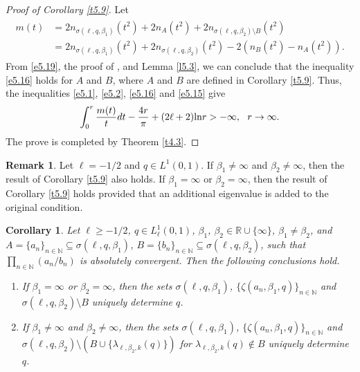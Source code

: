 \documentclass[reqno,12pt,centertags]{amsart}
\renewcommand{\ln}{\text{\rm ln}}
\numberwithin{equation}{section}
\newtheorem{corollary}[theorem]{Corollary}
\theoremstyle{definition}
\newtheorem{remark}{Remark}[section]
\begin{document}
\begin{proof}[Proof of Corollary \ref{t5.9}]
Let 
\begin{align}\label{e5.15}
\begin{split}
m(t)
&=2n_{\sigma(\ell, q, \beta_1)}(t^2)
+2n_A(t^2)
+2n_{\sigma(\ell, q, \beta_2)\setminus B}(t^2)\\
&= 2n_{\sigma(\ell, q, \beta_1)}(t^2)
+2n_{\sigma(\ell, q, \beta_2)}(t^2)
-2(n_B(t^2)-n_A(t^2)).
\end{split}
\end{align}
From \eqref{e5.19}, the proof of \cite[Lemma 4.5]{Hat2021}, and Lemma \ref{l5.3}, we can conclude that the inequality \eqref{e5.16} holds for $A$ and $B$, where $A$ and $B$ are defined in Corollary \ref{t5.9}. Thus, the inequalities \eqref{e5.1}, \eqref{e5.2}, \eqref{e5.16} and \eqref{e5.15} give  
\begin{align*}
\int_{0}^{r}\frac{m(t)}{t}dt
-\frac{4r}{\pi}
+(2\ell+2)\ln r 
 >-\infty, 
~~r\rightarrow\infty.
\end{align*}
The prove is completed by Theorem \ref{t4.3}. 
\end{proof}


\begin{remark}\label{r5.6}
Let $\ell=-1/2$ and $q \in L^{1}(0,1)$. If $\beta_{1}\neq\infty$ and $\beta_{2}\neq\infty$, 
then the result of Corollary \ref{t5.9} also holds. 
If $\beta_{1}=\infty$ or $\beta_{2}=\infty$, then the result of Corollary \ref{t5.9} holds provided that an additional eigenvalue is added to the original condition.
\end{remark}



\begin{corollary}\label{t5.8}
Let $\ell\geq-1/2$, $q\in L_{\ell}^{1}(0,1)$, $\beta_{1}$, $\beta_{2}\in\mathbb{R}\cup\{\infty\}$, $\beta_{1}\neq\beta_{2}$, and
$A=\{a_{n}\}_{n\in\mathbb{N}}\subseteq\sigma(\ell, q, \beta_1)$, 
$B=\{b_{n}\}_{n \in \mathbb{N}}\subseteq\sigma(\ell, q, \beta_2)$, 
such that $\prod\limits_{n \in \mathbb{N}}(a_{n} / b_{n})$ is absolutely convergent. 
Then the following conclusions hold.
\begin{enumerate}[label=\textnormal{(\arabic*)}.]
\item If $\beta_{1}=\infty$ or $\beta_{2}=\infty$, then the sets $\sigma(\ell, q, \beta_1)$, 
    $\{\zeta(a_{n},\beta_{1}, q)\}_{n\in \mathbb{N}}$ and 
    $\sigma(\ell, q, \beta_2)\setminus B$ uniquely determine $q$.
\item If $\beta_{1}\neq\infty$ and $\beta_{2}\neq\infty$, then the sets  $\sigma(\ell, q, \beta_1)$, 
    $\{\zeta(a_{n},\beta_{1}, q)\}_{n\in \mathbb{N}}$ and 
    $\sigma(\ell, q, \beta_2)\setminus (B\cup\{\lambda_{\ell, \beta_{2}, k}(q)\})$ for $\lambda_{\ell, \beta_{2}, k}(q)\notin B$ uniquely determine $q$.
\end{enumerate}
\end{corollary}
\end{document}
